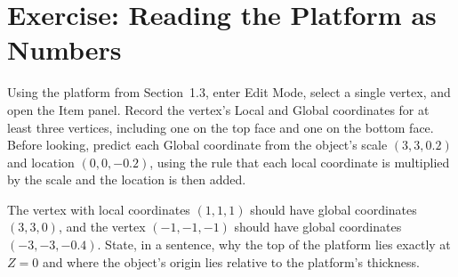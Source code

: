 \section{Exercise: Reading the Platform as Numbers}

\begin{exercise}
Using the platform from Section~1.3, enter Edit Mode, select a single vertex, and open the Item panel. Record the vertex's Local and Global coordinates for at least three vertices, including one on the top face and one on the bottom face. Before looking, predict each Global coordinate from the object's scale $(3,3,0.2)$ and location $(0,0,-0.2)$, using the rule that each local coordinate is multiplied by the scale and the location is then added.

The vertex with local coordinates $(1,1,1)$ should have global coordinates $(3,3,0)$, and the vertex $(-1,-1,-1)$ should have global coordinates $(-3,-3,-0.4)$. State, in a sentence, why the top of the platform lies exactly at $Z=0$ and where the object's origin lies relative to the platform's thickness.
\end{exercise}
